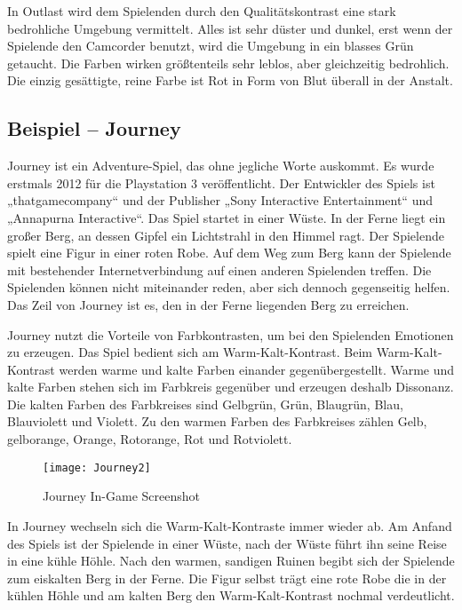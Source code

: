 In Outlast wird dem Spielenden durch den Qualitätskontrast eine stark bedrohliche Umgebung vermittelt. Alles ist sehr düster und dunkel, erst wenn der Spielende den Camcorder benutzt, wird die Umgebung in ein blasses Grün getaucht. Die Farben wirken größtenteils sehr leblos, aber gleichzeitig bedrohlich. Die einzig gesättigte, reine Farbe ist Rot in Form von Blut überall in der Anstalt. 
\cite{_outlast}
\cite{_farbkontraste}
\cite{_farbkontraste_im_gaming}

\subsection{Beispiel – Journey}
Journey ist ein Adventure-Spiel, das ohne jegliche Worte auskommt. Es wurde erstmals 2012 für die Playstation 3 veröffentlicht. Der Entwickler des Spiels ist „thatgamecompany“ und der Publisher „Sony Interactive Entertainment“ und „Annapurna Interactive“. Das Spiel startet in einer Wüste. In der Ferne liegt ein großer Berg, an dessen Gipfel ein Lichtstrahl in den Himmel ragt. Der Spielende spielt eine Figur in einer roten Robe. Auf dem Weg zum Berg kann der Spielende mit bestehender Internetverbindung auf einen anderen Spielenden treffen. Die Spielenden können nicht miteinander reden, aber sich dennoch gegenseitig helfen. Das Zeil von Journey ist es, den in der Ferne liegenden Berg zu erreichen.
\cite{_drawing_basics_and_video_game_art}
\cite{_farbkontraste_im_gaming}

Journey nutzt die Vorteile von Farbkontrasten, um bei den Spielenden Emotionen zu erzeugen. Das Spiel bedient sich am Warm-Kalt-Kontrast. Beim Warm-Kalt-Kontrast werden warme und kalte Farben einander gegenübergestellt. Warme und kalte Farben stehen sich im Farbkreis gegenüber und erzeugen deshalb Dissonanz. Die kalten Farben des Farbkreises sind Gelbgrün, Grün, Blaugrün, Blau, Blauviolett und Violett. Zu den warmen Farben des Farbkreises zählen Gelb, gelborange, Orange, Rotorange, Rot und Rotviolett.
\cite{_farbkontraste_im_gaming}
\cite{_drawing_basics_and_video_game_art}
\cite{_farbkontraste}

\begin{figure}[H]
	\centering
	\texttt{[image: Journey2]}
	\caption{Journey In-Game Screenshot\cite{_drawing_basics_and_video_game_art}}
\end{figure}

In Journey wechseln sich die Warm-Kalt-Kontraste immer wieder ab. Am Anfand des Spiels ist der Spielende in einer Wüste, nach der Wüste führt ihn seine Reise in eine kühle Höhle. Nach den warmen, sandigen Ruinen begibt sich der Spielende zum eiskalten Berg in der Ferne. Die Figur selbst trägt eine rote Robe die in der kühlen Höhle und am kalten Berg den Warm-Kalt-Kontrast nochmal verdeutlicht. 
\cite{_drawing_basics_and_video_game_art}
\cite{_farbkontraste_im_gaming}
\cite{_farbkontraste}

